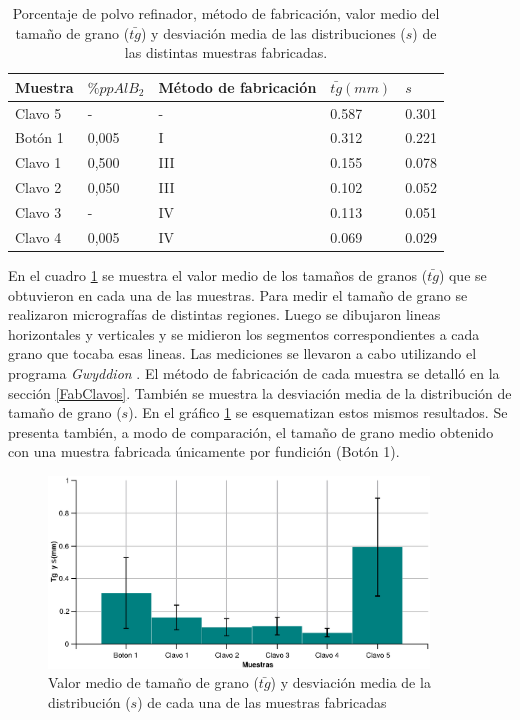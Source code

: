 \documentclass[a4paper,12pt,fleqn,twoside,openany]{book}
\begin{document}
\begin{table} 
\begin{center} 
\begin{tabular}{@{}lllll@{}} \toprule
Muestra & $\%pp AlB_2$ & Método de fabricación & $\bar{tg} (mm)$ & $s$ \\ \midrule
 Clavo 5 &  -     & -   & 0.587  & 0.301   \\
 Botón 1    &  0,005 & I   & 0.312 & 0.221  \\
 Clavo 1 &  0,500   & III & 0.155 & 0.078   \\
 Clavo 2 &  0,050  & III & 0.102 & 0.052   \\
 Clavo 3 &  -     & IV  & 0.113 & 0.051   \\
 Clavo 4 &  0,005 & IV  & 0.069 & 0.029   \\
\bottomrule
\end{tabular}
\caption{Porcentaje de polvo refinador, método de fabricación, valor medio del tamaño de grano ($\bar{tg}$) y desviación media de las distribuciones ($s$) de las distintas muestras fabricadas.}
\label{tab:ResClavos}
\end{center}
\end{table}


En el cuadro \ref{tab:ResClavos} se muestra el valor medio de los tamaños de granos ($\bar{tg}$) que se obtuvieron en cada una de las muestras. Para medir el tamaño de grano se realizaron micrografías de distintas regiones. Luego se dibujaron lineas horizontales y verticales y se midieron los segmentos correspondientes a cada grano que tocaba esas lineas. Las mediciones se llevaron a cabo utilizando el programa \textit{Gwyddion} \cite{Gwyddion}.  El método de fabricación de cada muestra se detalló en la sección \ref{FabClavos}. También se muestra la desviación media de la distribución de tamaño de grano ($s$). En el gráfico \ref{fig:tamaños} se esquematizan estos mismos resultados. Se presenta también, a modo de comparación, el tamaño de grano medio obtenido con una muestra fabricada únicamente por fundición (Botón 1).

 \begin{figure}[h]
 \centering
 \includegraphics[width=0.9\textwidth]{Img/Resultados/clavos/TamGranos.eps}
 \caption{Valor medio de tamaño de grano ($\bar{tg}$) y desviación media de la distribución ($s$) de cada una de las muestras fabricadas} 
 \label{fig:tamaños}
 \end{figure}
 
\end{document}
